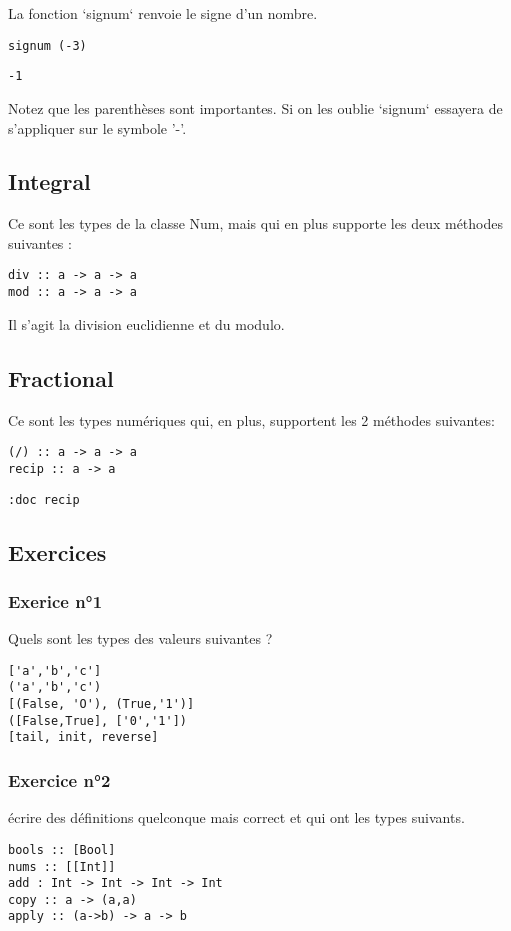 \documentclass[11pt]{article}
\begin{document}
La fonction `signum` renvoie le signe d'un nombre.
\begin{verbatim}
signum (-3)
\end{verbatim}
\begin{verbatim}
-1
\end{verbatim}

Notez que les parenthèses sont importantes.  Si on les oublie `signum` essayera de s'appliquer sur le symbole '-'.

\subsection{Integral}
\label{sec:org67efd16}
Ce sont les types de la classe Num,  mais qui en plus supporte les deux  méthodes suivantes :
\begin{verbatim}
div :: a -> a -> a
mod :: a -> a -> a
\end{verbatim}


Il s'agit la division euclidienne et du modulo.

\subsection{Fractional}
\label{sec:orge66f4ed}
Ce sont les types numériques qui, en plus, supportent les 2 méthodes suivantes:
\begin{verbatim}
(/) :: a -> a -> a
recip :: a -> a
\end{verbatim}


\begin{verbatim}
:doc recip
\end{verbatim}

\subsection{Exercices}
\label{sec:org642eba0}

\subsubsection{Exerice n°1}
\label{sec:org3eacd6f}
Quels sont les types des valeurs suivantes ?
\begin{verbatim}
['a','b','c']
('a','b','c')
[(False, 'O'), (True,'1')]
([False,True], ['0','1'])
[tail, init, reverse]
\end{verbatim}

\subsubsection{Exercice n°2}
\label{sec:orga0aef92}
écrire des définitions quelconque mais correct et qui ont les types suivants.
\begin{verbatim}
bools :: [Bool]
nums :: [[Int]]
add : Int -> Int -> Int -> Int
copy :: a -> (a,a)
apply :: (a->b) -> a -> b
\end{verbatim}
\end{document}
